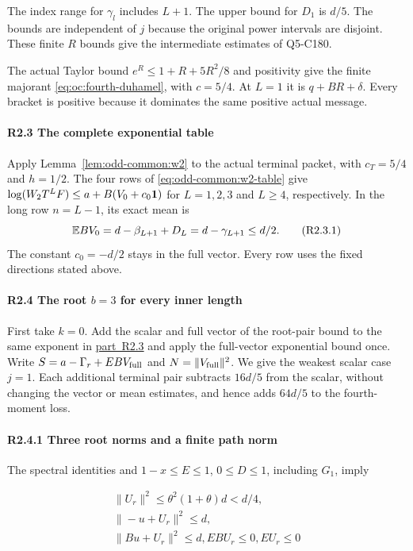 The index range for \(\gamma_l\) includes \(L+1\). The upper bound for \(D_1\) is \(d/5\). The bounds are independent of \(j\) because the original power intervals are disjoint. These finite \(R\) bounds give the intermediate estimates of Q5-C180.

The actual Taylor bound \(e^R\le1+R+5R^2/8\) and positivity give
the finite majorant \eqref{eq:oc:fourth-duhamel}, with \(c=5/4\).
At \(L=1\) it is \(q+BR+\delta\). Every bracket is positive
because it dominates the same positive actual message.

\paragraph{R2.3 The complete exponential table}\label{part:R2.3}

Apply Lemma~\ref{lem:odd-common:w2} to the actual terminal packet,
with \(c_T=5/4\) and \(h=1/2\).
The four rows of \eqref{eq:odd-common:w2-table} give
\(\log(W_2T^LF)\le a+B(V_0+c_0\mathbf1)\) for
\(L=1,2,3\) and \(L\ge4\), respectively.
In the long row \(n=L-1\), its exact mean is
\[
 \mathbb E BV_0=d-\beta_{L+1}+D_L=d-\gamma_{L+1}\le d/2.
 \tag{R2.3.1}
\]
The constant \(c_0=-d/2\) stays in the full vector.
Every row uses the fixed directions stated above.

\paragraph{R2.4 The root \(b=3\) for every inner length}\label{part:R2.4}

First take \(k=0\). Add the scalar and full vector of the root-pair bound to the same exponent in \mbox{\hyperref[part:R2.3]{part R2.3}} and apply the full-vector exponential bound once. Write \(S=a-\Gamma_r+EBV_{\rm full}\) and \(N=\|V_{\rm full}\|^2\). We give the weakest scalar case \(j=1\). Each additional terminal pair subtracts \(16d/5\) from the scalar, without changing the vector or mean estimates, and hence adds \(64d/5\) to the fourth-moment loss.

\paragraph{R2.4.1 Three root norms and a finite path norm}\label{part:R2.4.1}

The spectral identities and \(1-x\le E\le1\), \(0\le D\le1\), including \(G_1\), imply

\[
\begin{gathered}
\|U_r\|^2\le \theta^2(1+\theta)d<d/4,\\
\|-u+U_r\|^2\le d,\\
\|Bu+U_r\|^2\le d,EBU_r\le 0,EU_r\le 0 
\end{gathered}\tag{R2.4.1}
\]

